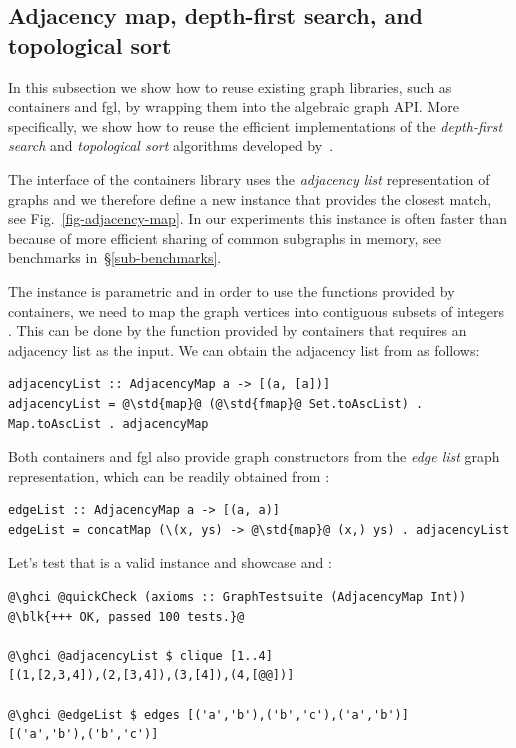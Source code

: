 \subsection{Adjacency map, depth-first search, and topological sort}\label{sub-adjacency-map}

In this subsection we show how to reuse existing graph libraries, such as
\textsf{containers} and \textsf{fgl}, by wrapping them into the algebraic
graph API. More specifically, we show how to reuse the efficient implementations
of the \emph{depth-first search} and \emph{topological sort} algorithms developed by~\citet{1995_king_graphs}.

The interface of the \textsf{containers} library uses the \emph{adjacency list}
representation of graphs and we therefore define a new  instance that
provides the closest match, see Fig.~\ref{fig-adjacency-map}. In our experiments
this instance is often faster than  because of more efficient
sharing of common subgraphs in memory, see benchmarks in~\S\ref{sub-benchmarks}.

The  instance is parametric and in order to use the
functions provided by \textsf{containers}, we need to map the graph vertices
into contiguous subsets of integers . This can be done by the function
 provided by \textsf{containers} that requires an adjacency
list as the input. We can obtain the adjacency list from  as
follows:

\begin{verbatim}
adjacencyList :: AdjacencyMap a -> [(a, [a])]
adjacencyList = @\std{map}@ (@\std{fmap}@ Set.toAscList) . Map.toAscList . adjacencyMap
\end{verbatim}
Both \textsf{containers} and \textsf{fgl} also provide graph constructors from the
\emph{edge list} graph representation, which can be readily obtained from
:

\begin{verbatim}
edgeList :: AdjacencyMap a -> [(a, a)]
edgeList = concatMap (\(x, ys) -> @\std{map}@ (x,) ys) . adjacencyList
\end{verbatim}

\noindent
Let's test that  is a valid  instance and
showcase  and :

\begin{verbatim}
@\ghci @quickCheck (axioms :: GraphTestsuite (AdjacencyMap Int))
@\blk{+++ OK, passed 100 tests.}@

@\ghci @adjacencyList $ clique [1..4]
[(1,[2,3,4]),(2,[3,4]),(3,[4]),(4,[@@])]

@\ghci @edgeList $ edges [('a','b'),('b','c'),('a','b')]
[('a','b'),('b','c')]
\end{verbatim}

